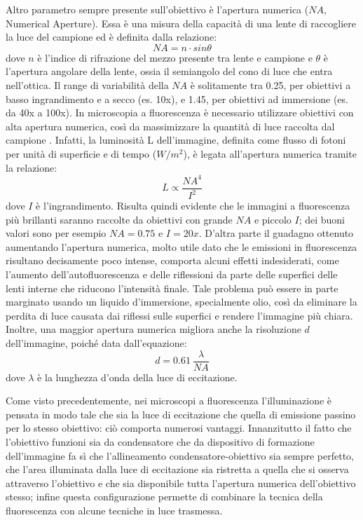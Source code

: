 Altro parametro sempre presente sull'obiettivo è l'apertura numerica ($NA$, Numerical Aperture). 
Essa è una misura della capacità di una lente di raccogliere la luce del campione ed è definita dalla relazione:
$$ NA = n \cdot sin \theta $$
dove $n$ è l'indice di rifrazione del mezzo presente tra lente e campione e $\theta$ è l'apertura angolare della lente, ossia il semiangolo del cono di luce che entra nell'ottica. 
Il range di variabilità della $NA$ è solitamente tra 0.25, per obiettivi a basso ingrandimento e a secco (es. 10x), e 1.45, per obiettivi ad immersione (es. da 40x a 100x). 
In microscopia a fluorescenza è necessario utilizzare obiettivi con alta apertura numerica, così da massimizzare la quantità di luce raccolta dal campione \cite{NA}.
Infatti, la luminosità L dell'immagine, definita come flusso di fotoni per unità di superficie e di tempo ($W/m^2$), è legata all'apertura numerica tramite la relazione:
$$L  \propto  \frac {NA^4}{I^2}$$
dove $I$ è l'ingrandimento. 
Risulta quindi evidente che le immagini a fluorescenza più brillanti saranno raccolte da obiettivi con grande $NA$ e piccolo $I$; dei buoni valori sono per esempio $NA=0.75$ e $I=20x$.
D'altra parte il guadagno ottenuto aumentando l'apertura numerica, molto utile dato che le emissioni in fluorescenza risultano decisamente poco intense, comporta alcuni effetti indesiderati, come l'aumento dell'autofluorescenza e delle riflessioni da parte delle superfici delle lenti interne che riducono l'intensità finale. 
Tale problema può essere in parte marginato usando un liquido d'immersione, specialmente olio, così da eliminare la perdita di luce
causata dai riflessi sulle superfici e rendere l'immagine più chiara. 
Inoltre, una maggior apertura numerica migliora anche la risoluzione $d$ dell'immagine, poiché data dall'equazione:
$$d = 0.61 \ \frac {\lambda}{NA} $$
dove $\lambda$ è la lunghezza d'onda della luce di eccitazione.

Come visto precedentemente, nei microscopi a fluorescenza l'illuminazione è pensata in modo tale che sia la luce di eccitazione che quella di emissione passino per lo stesso obiettivo: ciò comporta numerosi vantaggi. 
Innanzitutto il fatto che l'obiettivo funzioni sia da condensatore che da dispositivo di formazione dell'immagine fa sì che l'allineamento condensatore-obiettivo sia sempre perfetto, che l'area illuminata dalla luce di eccitazione sia ristretta a quella che si osserva attraverso l'obiettivo e che sia disponibile tutta l'apertura numerica dell'obiettivo stesso; infine questa configurazione permette di combinare la tecnica della fluorescenza con alcune tecniche in luce trasmessa.


